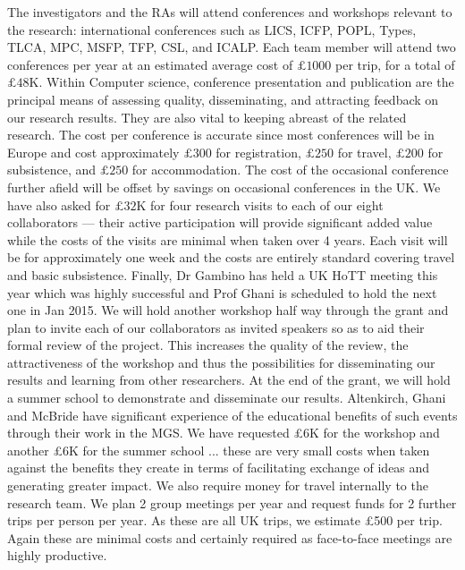 \documentclass[a4paper,11pt]{article}
\begin{document}
 The investigators and the RAs will
attend conferences and workshops relevant to the research:
international conferences such as LICS, ICFP, POPL, Types, TLCA, MPC,
MSFP, TFP, CSL, and ICALP. Each team member will attend two
conferences per year at an estimated average cost of $\pounds 1000$
per trip, for a total of $\pounds 48$K. Within Computer science,
conference presentation and publication are the principal means of
assessing quality, disseminating, and attracting feedback
on our research results. They are also vital to keeping abreast of
the related research. The cost per conference
is accurate since most conferences will be in Europe and cost
approximately $\pounds 300$ for registration, $\pounds 250$ for
travel, $\pounds 200$ for subsistence, and $\pounds 250$ for
accommodation. The cost of the occasional conference further afield
will be offset by savings on occasional conferences in the UK. We have also asked for $\pounds 32$K for four
research visits to each of our eight collaborators --- their active
participation will provide significant added value while the costs of
the visits are minimal when taken over 4 years. Each visit will be for
approximately one week and the costs are entirely standard covering
travel and basic subsistence. Finally, Dr Gambino has held a UK HoTT
meeting this year which was highly successful and Prof Ghani is
scheduled to hold the next one in Jan 2015. We will hold another
workshop half way through the grant and plan to invite each of our
collaborators as invited speakers so as to aid their formal review of
the project. This increases the quality of the review, the
attractiveness of the workshop and thus the possibilities for
disseminating our results and learning from other researchers. At the
end of the grant, we will hold a summer school to demonstrate and
disseminate our results. Altenkirch, Ghani and McBride have
significant experience of the educational benefits of such 
events through their work in the MGS. We have requested \pounds 6K for
the workshop and another \pounds 6K for the summer school ... these
are very small costs when taken against the benefits they create in
terms of facilitating exchange of ideas and generating greater
impact. We also require money for travel internally to the research
team. We plan 2 group meetings per year and request funds for 2
further trips per person per year. As these are all UK trips, we
estimate \pounds 500 per trip. Again these are minimal costs and
certainly required as face-to-face meetings are highly productive.


%
\end{document}
